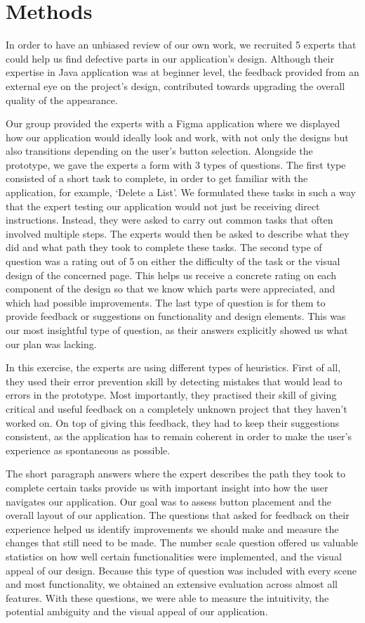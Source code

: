 \section{Methods}

In order to have an unbiased review of our own work, we recruited 5 experts that could help us find defective parts in our application’s design. Although their expertise in Java application was at beginner level, the feedback provided from an external eye on the project’s design, contributed towards upgrading the overall quality of the appearance.
	   
Our group provided the experts with a Figma application where we displayed how our application would ideally look and work, with not only the designs but also transitions depending on the user’s button selection. Alongside the prototype, we gave the experts a form with 3 types of questions. The first type consisted of a short task to complete, in order to get familiar with the application, for example, ‘Delete a List’. We formulated these tasks in such a way that the expert testing our application would not just be receiving direct instructions. Instead, they were asked to carry out common tasks that often involved multiple steps. The experts would then be asked to describe what they did and what path they took to complete these tasks. The second type of question was a rating out of 5 on either the difficulty of the task or the visual design of the concerned page. This helps us receive a concrete rating on each component of the design so that we know which parts were appreciated, and which had possible improvements. The last type of question is for them to provide feedback or suggestions on functionality and design elements. This was our most insightful type of question, as their answers explicitly showed us what our plan was lacking. 

In this exercise, the experts are using different types of heuristics. First of all, they used their error prevention skill by detecting mistakes that would lead to errors in the prototype. Most importantly, they practised their skill of giving critical and useful feedback on a completely unknown project that they haven’t worked on. On top of giving this feedback, they had to keep their suggestions consistent, as the application has to remain coherent in order to make the user’s experience as spontaneous as possible. 

The short paragraph answers where the expert describes the path they took to complete certain tasks provide us with important insight into how the user navigates our application. Our goal was to assess button placement and the overall layout of our application. The questions that asked for feedback on their experience helped us identify improvements we should make and measure the changes that still need to be made. The number scale question offered us valuable statistics on how well certain functionalities were implemented, and the visual appeal of our design. Because this type of question was included with every scene and most functionality, we obtained an extensive evaluation across almost all features. With these questions, we were able to measure the intuitivity, the potential ambiguity and the visual appeal of our application.
